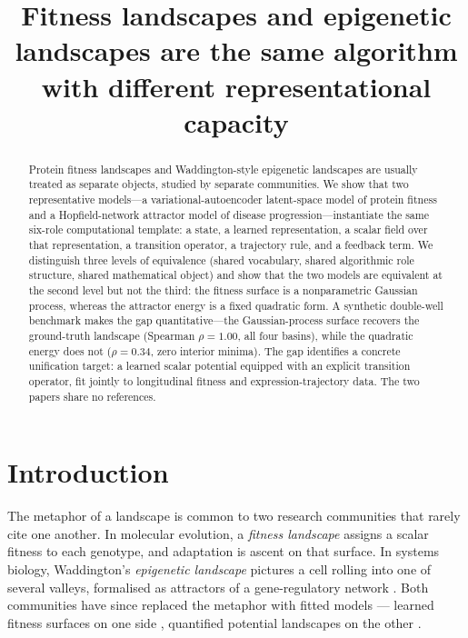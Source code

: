 \documentclass[11pt]{article}
\title{\bfseries Fitness landscapes and epigenetic landscapes are the same algorithm\\
\large with different representational capacity}
\author{}
\date{}
\begin{document}
\maketitle
\vspace{-2.2em}
\begin{abstract}
Protein fitness landscapes and Waddington-style epigenetic landscapes are usually treated as separate objects, studied by separate communities. We show that two representative models---a variational-autoencoder latent-space model of protein fitness and a Hopfield-network attractor model of disease progression---instantiate the same six-role computational template: a state, a learned representation, a scalar field over that representation, a transition operator, a trajectory rule, and a feedback term. We distinguish three levels of equivalence (shared vocabulary, shared algorithmic role structure, shared mathematical object) and show that the two models are equivalent at the second level but not the third: the fitness surface is a nonparametric Gaussian process, whereas the attractor energy is a fixed quadratic form. A synthetic double-well benchmark makes the gap quantitative---the Gaussian-process surface recovers the ground-truth landscape (Spearman $\rho=1.00$, all four basins), while the quadratic energy does not ($\rho=0.34$, zero interior minima). The gap identifies a concrete unification target: a learned scalar potential equipped with an explicit transition operator, fit jointly to longitudinal fitness and expression-trajectory data. The two papers share no references.
\end{abstract}

\section{Introduction}
The metaphor of a landscape is common to two research communities that rarely cite one another. In molecular
evolution, a \emph{fitness landscape} assigns a scalar fitness to each genotype, and adaptation is ascent on that
surface. In systems biology, Waddington's \emph{epigenetic landscape} \citep{waddington1957strategy} pictures a cell
rolling into one of several valleys, formalised as attractors of a gene-regulatory network
\citep{huang2005cellfates}. Both communities have since replaced the metaphor with fitted models --- learned fitness
surfaces on one side \citep{riesselman2018deepseq,rives2021esm}, quantified potential landscapes on the other
\citep{wang2011waddington,huang2009cancer}.
\end{document}
